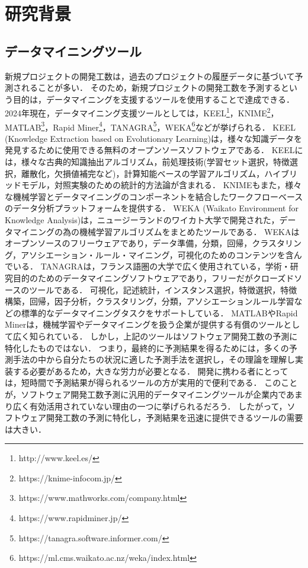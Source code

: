 \section{研究背景}\label{sec:2}

\subsection{データマイニングツール}\label{データマイニングツール}
新規プロジェクトの開発工数は，過去のプロジェクトの履歴データに基づいて予測されることが多い．
そのため，新規プロジェクトの開発工数を予測するという目的は，データマイニングを支援するツールを使用することで達成できる．
2024年現在，データマイニング支援ツールとしては，KEEL\footnote{http://www.keel.es/}，KNIME\footnote{https://knime-infocom.jp/}，MATLAB\footnote{https://www.mathworks.com/company.html}，Rapid Miner\footnote{https://www.rapidminer.jp/}，TANAGRA\footnote{https://tanagra.software.informer.com/}，WEKA\footnote{https://ml.cms.waikato.ac.nz/weka/index.html}などが挙げられる．
KEEL (Knowledge Extraction based on Evolutionary Learning)\footnotemark[1]は，様々な知識データを発見するために使用できる無料のオープンソースソフトウェアである．
KEELには，様々な古典的知識抽出アルゴリズム，前処理技術(学習セット選択，特徴選択，離散化，欠損値補完など)，計算知能ベースの学習アルゴリズム，ハイブリッドモデル，対照実験のための統計的方法論が含まれる．
KNIME\footnotemark[2]もまた，様々な機械学習とデータマイニングのコンポーネントを結合したワークフローベースのデータ分析プラットフォームを提供する．
WEKA (Waikato Environment for Knowledge Analysis)\footnotemark[6]は，ニュージーランドのワイカト大学で開発された，データマイニングの為の機械学習アルゴリズムをまとめたツールである．
WEKAはオープンソースのフリーウェアであり，データ準備，分類，回帰，クラスタリング，アソシエーション・ルール・マイニング，可視化のためのコンテンツを含んでいる．
TANAGRA\footnotemark[5]は，フランス語圏の大学で広く使用されている，学術・研究目的のためのデータマイニングソフトウェアであり，フリーだがクローズドソースのツールである．
可視化，記述統計，インスタンス選択，特徴選択，特徴構築，回帰，因子分析，クラスタリング，分類，アソシエーションルール学習などの標準的なデータマイニングタスクをサポートしている．
MATLAB\footnotemark[3]やRapid Miner\footnotemark[4]は，機械学習やデータマイニングを扱う企業が提供する有償のツールとして広く知られている．
しかし，上記のツールはソフトウェア開発工数の予測に特化したものではない．
つまり，最終的に予測結果を得るためには，多くの予測手法の中から自分たちの状況に適した予測手法を選択し，その理論を理解し実装する必要があるため，大きな労力が必要となる．
開発に携わる者にとっては，短時間で予測結果が得られるツールの方が実用的で便利である．
このことが，ソフトウェア開発工数予測に汎用的データマイニングツールが企業内であまり広く有効活用されていない理由の一つに挙げられるだろう．
したがって，ソフトウェア開発工数の予測に特化し，予測結果を迅速に提供できるツールの需要は大きい．

